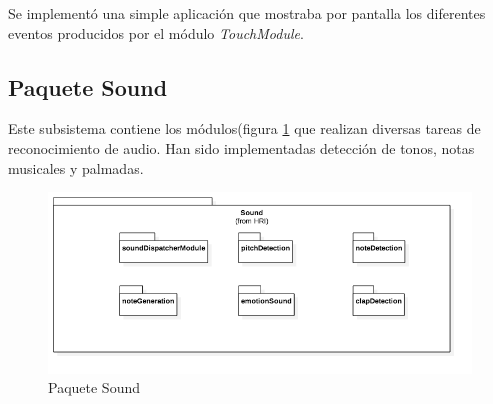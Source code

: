 Se implementó una simple aplicación que mostraba por pantalla los diferentes eventos producidos por el módulo \textit{TouchModule}.


\newpage

\subsection{Paquete Sound}
Este subsistema contiene los módulos(figura \ref{fig:sound-package} que realizan diversas tareas de reconocimiento de audio.  Han sido implementadas detección de tonos, notas musicales y palmadas.
\begin{figure}
	\centering
	\includegraphics[width=1\linewidth]{imagenes/diagramas/Sound.png}
	\caption{Paquete Sound}
	\label{fig:sound-package}
\end{figure}
